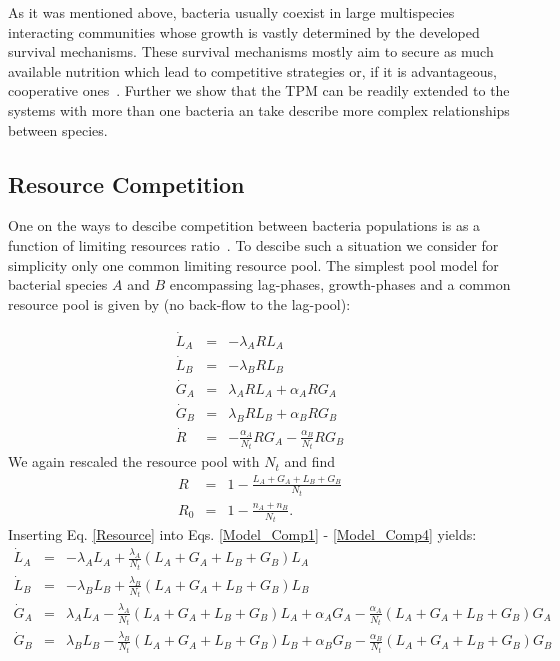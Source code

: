 \documentclass[10pt,A4paper]{article}
\begin{document}
As it was mentioned above, bacteria usually coexist in large multispecies interacting communities whose growth is vastly determined by the developed survival mechanisms.
These survival mechanisms mostly aim to secure as much available nutrition which lead to competitive strategies or, if it is advantageous, cooperative ones~\cite{hibbing_bacterial_2010, stubbendieck_bacterial_2016}.
Further we show that the TPM can be readily extended to the systems with more than one bacteria an take describe more complex relationships between species. 


\subsection{Resource Competition}

One on the ways to descibe competition between bacteria populations is as a function of limiting resources ratio~\cite{tilman_resource_1977, smith_effects_2002}.
To descibe such a situation we consider for simplicity only one common limiting resource pool. 
The simplest pool model for bacterial species $A$ and $B$ encompassing lag-phases, growth-phases and a common resource pool is given by (no back-flow to the lag-pool):

\begin{eqnarray}
\label{Model_Comp1}
\dot{L}_A &=& - \lambda_A R L_A\\
\dot{L}_B &=& - \lambda_B R L_B \\
\dot{G}_A &=& \lambda_A R L_A +\alpha_A R G_A\\
\label{Model_Comp4}
\dot{G}_B &=& \lambda_B R L_B +\alpha_B R G_B\\
\dot{R} &=&-\frac{\alpha_A}{N_t} R G_A-\frac{\alpha_B}{N_t} R G_B
\end{eqnarray}
We again rescaled the resource pool with $N_t$ and find
\begin{eqnarray}
\label{Resource}
R &=&1-\frac{L_A+G_A+L_B+G_B}{N_t}\\
R_0&=&1-\frac{n_A+n_B}{N_t}. 
\end{eqnarray}
Inserting Eq. \ref{Resource} into Eqs. \ref{Model_Comp1} - \ref{Model_Comp4} yields:
\begin{eqnarray*}
\dot{L}_A &=& - \lambda_A  L_A + \frac{\lambda_A}{N_t}\left(L_A+G_A+L_B+G_B\right )L_A\\
\dot{L}_B &=& - \lambda_B L_B + \frac{\lambda_B}{N_t}\left(L_A+G_A+L_B+G_B\right )L_B \\
\dot{G}_A &=&  \lambda_A  L_A - \frac{\lambda_A}{N_t}\left(L_A+G_A+L_B+G_B\right )L_A +\alpha_A G_A - \frac{\alpha_A}{N_t}\left(L_A+G_A+L_B+G_B\right )G_A\\
\dot{G}_B &=& \lambda_B L_B - \frac{\lambda_B}{N_t}\left(L_A+G_A+L_B+G_B\right )L_B  +\alpha_B G_B -\frac{\alpha_B}{N_t}\left(L_A+G_A+L_B+G_B\right )G_B
\end{eqnarray*}
\end{document}

